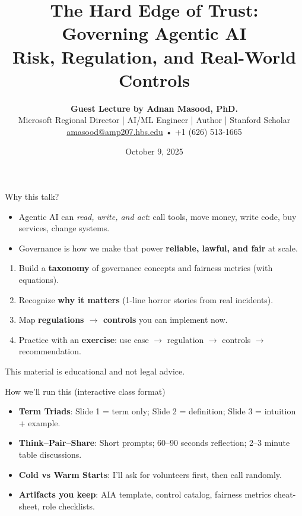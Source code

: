 \documentclass[11pt,aspectratio=169]{beamer}
\title[Governance for Agentic AI]{\textbf{The Hard Edge of Trust: Governing Agentic AI}\\[-2pt]\large Risk, Regulation, and Real-World Controls}
\author[\textbf{Adnan Masood, PhD.}]{\textbf{Guest Lecture by Adnan Masood, PhD.}\\Microsoft Regional Director \;|\; AI/ML Engineer \;|\; Author \;|\; Stanford Scholar\\[-2pt]\small \href{mailto:amasood@amp207.hbs.edu}{amasood@amp207.hbs.edu} \;•\; +1 (626) 513-1665}
\institute[USF]{University of South Florida \;—\; Graduate AI Seminar}
\date{October 9, 2025}
\newcommand{\tinyref}[1]{\textcolor{black!60}{\scriptsize#1}}
\newcommand{\SECHdr}[1]{\vspace{-2pt}\textbf{\color{MasoodBlue}{#1}}\vspace{2pt}\par}
\begin{document}
\begin{frame}
  \titlepage
\end{frame}

\begin{frame}{Why this talk?}
\SECHdr{AI crossed from novelty to infrastructure.}
\begin{itemize}
  \item Agentic AI can \emph{read, write, and act}: call tools, move money, write code, buy services, change systems.
  \item Governance is how we make that power \textbf{reliable, lawful, and fair} at scale.
\end{itemize}
\medskip
\SECHdr{Learning outcomes}
\begin{enumerate}
  \item Build a \textbf{taxonomy} of governance concepts and fairness metrics (with equations).
  \item Recognize \textbf{why it matters} (1-line horror stories from real incidents).
  \item Map \textbf{regulations $\rightarrow$ controls} you can implement now.
  \item Practice with an \textbf{exercise}: use case $\rightarrow$ regulation $\rightarrow$ controls $\rightarrow$ recommendation.
\end{enumerate}
\tinyref{This material is educational and not legal advice.}
\end{frame}

\begin{frame}{How we'll run this (interactive class format)}
\begin{itemize}
  \item \textbf{Term Triads}: Slide 1 = term only; Slide 2 = definition; Slide 3 = intuition + example.
  \item \textbf{Think–Pair–Share}: Short prompts; 60–90 seconds reflection; 2–3 minute table discussions.
  \item \textbf{Cold vs Warm Starts}: I’ll ask for volunteers first, then call randomly.
  \item \textbf{Artifacts you keep}: AIA template, control catalog, fairness metrics cheat-sheet, role checklists.
\end{itemize}
\end{frame}
\end{document}
